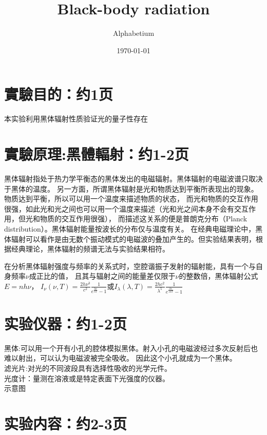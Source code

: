 \documentclass[12pt, a4paper, oneside]{article}
\title{Black-body radiation}
\date{\today}
\author{Alphabetium}
\begin{document}
\begin{spacing}{2.0}
\tableofcontents
\maketitle

\section{實驗目的：约1页}
本实验利用黑体辐射性质验证光的量子性存在
\section{實驗原理:黑體輻射：约1-2页}
黑体辐射指处于热力学平衡态的黑体发出的电磁辐射。黑体辐射的电磁波谱只取决于黑体的温度。
另一方面，所谓黑体辐射是光和物质达到平衡所表现出的现象。物质达到平衡，所以可以用一个温度来描述物质的状态，
而光和物质的交互作用很强，如此光和光之间也可以用一个温度来描述（光和光之间本身不会有交互作用，但光和物质的交互作用很强），
而描述这关系的便是普朗克分布（Planck distribution）。黑体辐射能量按波长的分布仅与温度有关。
在经典电磁理论中，黑体辐射可以看作是由无数个振动模式的电磁波的叠加产生的。但实验结果表明，根据经典理论，黑体辐射的频谱无法与实验结果相符。

在分析黑体辐射强度与频率的关系式时，空腔谐振子发射的辐射能，具有一个与自身频率$\nu$成正比的值，
且其与辐射之间的能量差仅限于$\nu$的整数倍，黑体辐射公式$E = n h \nu$，
$I_{\nu}(\nu,T) =\frac{2  h\nu^{3}}{c^2}\frac{1}{e^{\frac{h\nu}{kT}} - 1}$或$I_{\lambda}(\lambda,T) =\frac{2 hc^2}{\lambda^5}\frac{1}{e^{\frac{hc}{\lambda kT}} - 1}$



\section{实验仪器：约1-2页}
黑体:可以用一个开有小孔的腔体模拟黑体。射入小孔的电磁波经过多次反射后也难以射出，可以认为电磁波被完全吸收。
因此这个小孔就成为一个黑体。\\
滤光片:对光的不同波段具有选择性吸收的光学元件。 \\
光度计：量测在溶液或是特定表面下光强度的仪器。\\
示意图

\section{实验内容：约2-3页}


\end{spacing}
\end{document}
